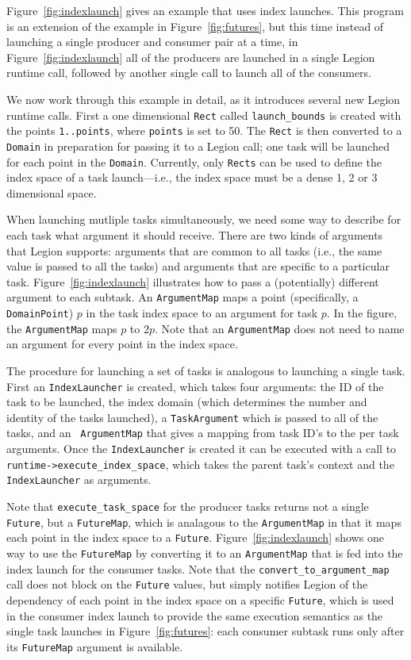 Figure~\ref{fig:indexlaunch} gives an example that uses index
launches. This program is an extension of the example in
Figure~\ref{fig:futures}, but this time instead of launching a single
producer and consumer pair at a time, in Figure~\ref{fig:indexlaunch}
all of the producers are launched in a single Legion runtime call,
followed by another single call to launch all of the consumers.

We now work through this example in detail, as it introduces several
new Legion runtime calls.  First a one dimensional {\tt Rect} called
{\tt launch\_bounds} is created with the points {\tt 1..points}, where
{\tt points} is set to 50. The {\tt Rect} is then converted to a {\tt
  Domain} in preparation for passing it to a Legion call; one task will
be launched for each point in the {\tt Domain}.  Currently, only
{\tt Rects} can be used to define the index space of a task launch---i.e.,
the index space must be a dense 1, 2 or 3 dimensional space.

When launching mutliple tasks simultaneously, we need some way to
describe for each task what argument it should receive.  There are two
kinds of arguments that Legion supports: arguments that are common to
all tasks (i.e., the same value is passed to all the tasks) and
arguments that are specific to a particular task.
Figure~\ref{fig:indexlaunch} illustrates how to pass a (potentially)
different argument to each subtask.  An {\tt ArgumentMap} maps a point
(specifically, a {\tt DomainPoint}) $p$ in the task index space to an
argument for task $p$. In the figure, the {\tt ArgumentMap} maps $p$
to $2p$.  Note that an {\tt ArgumentMap} does not need to name an argument
for every point in the index space.

The procedure for launching a set of tasks is analogous to launching a
single task.  First an {\tt IndexLauncher} is created, which takes
four arguments: the ID of the task to be launched, the index domain
(which determines the number and identity of the tasks launched), a
{\tt TaskArgument} which is passed to all of the tasks, and an {\tt
  ArgumentMap} that gives a mapping from task ID's to the per task
arguments.  Once the {\tt IndexLauncher} is created it can be executed
with a call to {\tt runtime->execute\_index\_space}, which 
takes the parent task's context and the {\tt IndexLauncher} as arguments.

Note that {\tt execute\_task\_space} for the producer tasks returns not
a single {\tt Future}, but a {\tt FutureMap}, which is analagous to
the {\tt ArgumentMap} in that it maps each point in the index
space to a {\tt Future}.  Figure~\ref{fig:indexlaunch} shows one way to
use the {\tt FutureMap} by converting it to an {\tt ArgumentMap} that is fed into
the index launch for the consumer tasks.  Note that the {\tt convert\_to\_argument\_map} call
does not block on the {\tt Future} values, but simply notifies Legion of the dependency
of each point in the index space on a specific {\tt Future}, which is used in the
consumer index launch to provide the same execution semantics as the single task
launches in Figure~\ref{fig:futures}: each consumer subtask runs only after its {\tt FutureMap}
argument is available.


